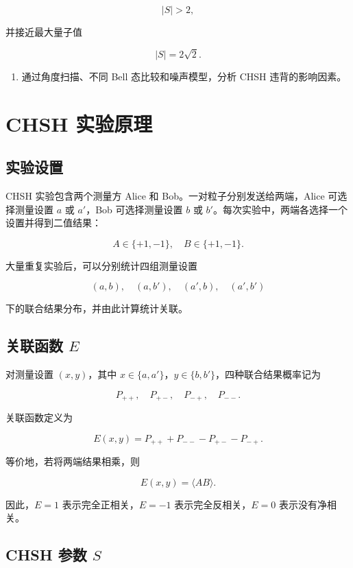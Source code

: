 \documentclass{zjureport}
\providecommand{\tightlist}{%
  \setlength{\itemsep}{0pt}\setlength{\parskip}{0pt}}
\begin{document}
\[
|S|>2,
\]

并接近最大量子值

\[
|S|=2\sqrt{2}.
\]

\begin{enumerate}
\def\labelenumi{\arabic{enumi}.}
\setcounter{enumi}{4}
\tightlist
\item
  通过角度扫描、不同 Bell 态比较和噪声模型，分析 CHSH 违背的影响因素。
\end{enumerate}

\section{CHSH 实验原理}\label{chsh-ux5b9eux9a8cux539fux7406}

\subsection{实验设置}\label{ux5b9eux9a8cux8bbeux7f6e}

CHSH 实验包含两个测量方 Alice 和 Bob。一对粒子分别发送给两端，Alice 可选择测量设置 \(a\) 或 \(a'\)，Bob 可选择测量设置 \(b\) 或 \(b'\)。每次实验中，两端各选择一个设置并得到二值结果：

\[
A\in\{+1,-1\},\quad B\in\{+1,-1\}.
\]

大量重复实验后，可以分别统计四组测量设置

\[
(a,b),\quad (a,b'),\quad (a',b),\quad (a',b')
\]

下的联合结果分布，并由此计算统计关联。

\subsection{\texorpdfstring{关联函数 \(E\)}{关联函数 E}}\label{ux5173ux8054ux51fdux6570-e}

对测量设置 \((x,y)\)，其中 \(x\in\{a,a'\}\)，\(y\in\{b,b'\}\)，四种联合结果概率记为

\[
P_{++},\quad P_{+-},\quad P_{-+},\quad P_{--}.
\]

关联函数定义为

\[
E(x,y)=P_{++}+P_{--}-P_{+-}-P_{-+}.
\]

等价地，若将两端结果相乘，则

\[
E(x,y)=\langle AB\rangle.
\]

因此，\(E=1\) 表示完全正相关，\(E=-1\) 表示完全反相关，\(E=0\) 表示没有净相关。

\subsection{\texorpdfstring{CHSH 参数 \(S\)}{CHSH 参数 S}}\label{chsh-ux53c2ux6570-s}
\end{document}
